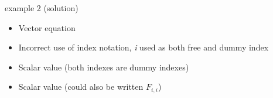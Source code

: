 \documentclass[
  letterpaper,
  ignorenonframetext,
  aspectratio=43,
  handout,
  12pt]{beamer}
\providecommand{\tightlist}{%
  \setlength{\itemsep}{0pt}\setlength{\parskip}{0pt}}
\providecommand{\tightlist}{%
\setlength{\itemsep}{0pt}\setlength{\parskip}{0pt}}
\begin{document}
\begin{frame}{example 2 (solution)}
\protect\hypertarget{example-2-solution}{}
\begin{itemize}
\tightlist
\item
  Vector equation
\item
  Incorrect use of index notation, \emph{i} used as both free and dummy
  index
\item
  Scalar value (both indexes are dummy indexes)
\item
  Scalar value (could also be written \(F_{i,i}\))
\end{itemize}
\end{frame}
\end{document}
